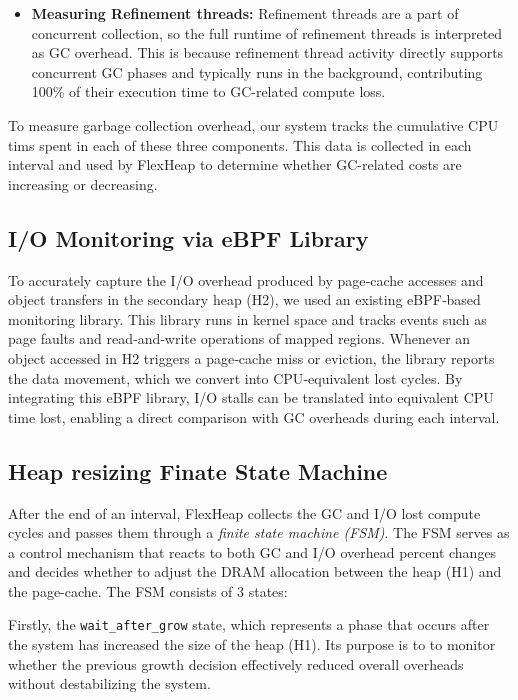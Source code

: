 \begin{itemize}
  \item \textbf{Measuring Refinement threads:} Refinement threads are a part of concurrent collection, 
  so the full runtime of refinement threads is interpreted as GC overhead. This is because refinement thread 
  activity directly supports concurrent GC phases and typically runs in the background,
  contributing 100\% of their execution time to GC-related compute loss.

\end{itemize}

To measure garbage collection overhead, our system tracks the cumulative CPU tims spent in each of these three components. 
This data is collected in each interval and used by FlexHeap to determine whether GC-related costs are increasing or decreasing.

\subsection{I/O Monitoring via eBPF Library}

To accurately capture the I/O overhead produced by page‑cache accesses 
and object transfers in the secondary heap (H2), we used an existing 
eBPF‑based monitoring library. This library runs in kernel space and tracks events such as page faults and read‑and‑write
operations of mapped regions. Whenever an object accessed in H2 triggers a page‑cache miss or eviction, the library reports the 
data movement, which we convert into CPU‑equivalent lost cycles. 
By integrating this eBPF library, I/O stalls can be translated into equivalent 
CPU time lost, enabling a direct comparison with GC overheads during each interval.



\subsection{Heap resizing Finate State Machine}

After the end of an interval, FlexHeap collects the GC and I/O lost compute cycles and passes them through 
a \textit{finite state machine (FSM)}. The FSM serves as a control mechanism 
that reacts to both GC and I/O overhead percent changes and decides whether to adjust the DRAM allocation 
between the heap (H1) and the page-cache. The FSM consists of 3 states:

Firstly, the \texttt{wait\_after\_grow} state, which represents a phase that occurs after 
the system has increased the size of the heap (H1). Its purpose is to 
to monitor whether the previous growth decision effectively 
reduced overall overheads without destabilizing the system. 


